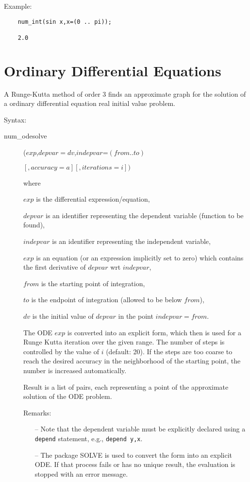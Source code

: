 Example:

\begin{verbatim}
    num_int(sin x,x=(0 .. pi));

    2.0
\end{verbatim}

\section{Ordinary Differential Equations}
\hypertarget{operator:NUM_ODESOLVE}{}

A Runge-Kutta method of order 3 finds an approximate graph for
the solution of a ordinary differential equation
real initial value problem.

Syntax:
\begin{description}
\item[num\_odesolve]($exp$,$depvar=dv$,$indepvar$=$(from .. to)$

$                   [,accuracy=a][,iterations=i]) $

where

$exp$ is the differential expression/equation,

$depvar$ is an identifier representing the dependent variable
(function to be found),

$indepvar$ is an identifier representing the independent variable,

$exp$ is an equation (or an expression implicitly set to zero) which
contains the first derivative of $depvar$ wrt $indepvar$,

$from$ is the starting point of integration,

$to$ is the endpoint of integration (allowed to be below $from$),

$dv$ is the initial value of $depvar$ in the point $indepvar=from$.

The ODE $exp$ is converted into an explicit form, which then is
used for a Runge Kutta iteration over the given range. The
number of steps is controlled by the value of $i$
(default: 20).
If the steps are too coarse to reach the desired
accuracy in the neighborhood of the starting point, the number is
increased automatically.

Result is a list of pairs, each representing a point of the
approximate solution of the ODE problem.

Remarks:
\begin{enumerate}

  \item[--]
Note that the dependent variable must be explicitly declared
using a \texttt{depend} statement, e.g., \texttt{depend y,x}.
\item[--] The \REDUCE{} package \textsc{SOLVE} is used to convert the form into
an explicit ODE. If that process fails or has no unique result,
the evaluation is stopped with an error message.

\end{enumerate}

\end{description}

